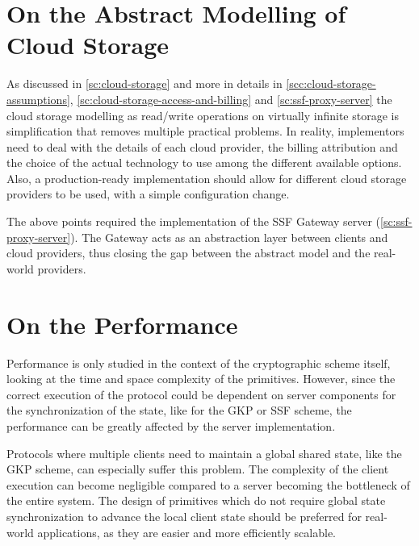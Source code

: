 \section{On the Abstract Modelling of Cloud Storage}\label{sc:gap-abstract-cloud-storage}

As discussed in \cref{sc:cloud-storage} and more in details in 
\cref{scc:cloud-storage-assumptions},
\cref{sc:cloud-storage-access-and-billing}
and \cref{sc:ssf-proxy-server} the cloud storage modelling
as read/write operations on virtually infinite storage
is simplification that removes multiple practical problems. 
In reality, implementors need to
deal with the details of each cloud provider, the billing attribution
and the choice of the actual technology to use among
the different available options.
Also, a production-ready
implementation should allow for different cloud storage
providers to be used, with a simple configuration change.

The above points required the implementation of the
SSF Gateway server (\cref{sc:ssf-proxy-server}).
The Gateway acts as an abstraction layer between clients
and cloud providers, thus closing the gap
between the abstract model and the real-world providers.

\section{On the Performance}\label{sc:gap-performance}

Performance is only studied in the context of the
cryptographic scheme itself, looking at the time and
space complexity of the primitives.
However, since the correct execution of the protocol
could be dependent on server components for the synchronization
of the state, like for the GKP or SSF scheme, the performance
can be greatly affected by the server implementation.

Protocols where multiple clients need to maintain
a global shared state, like the GKP scheme, can especially
suffer this problem. The complexity of the client
execution can become negligible compared to a server
becoming the bottleneck of the entire system.
The design of primitives which do not require 
global state synchronization to advance the local
client state should be preferred
for real-world applications, as they are easier 
and more efficiently scalable.



